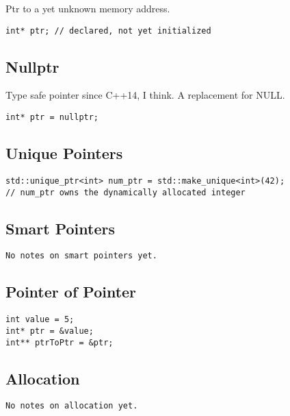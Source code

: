 Ptr to a yet unknown memory address.

\begin{verbatim}
int* ptr; // declared, not yet initialized
\end{verbatim}

\subsection{Nullptr}

Type safe pointer since C++14, I think. A replacement for NULL.

\begin{verbatim}
int* ptr = nullptr;
\end{verbatim}

\subsection{Unique Pointers}

\begin{verbatim}
std::unique_ptr<int> num_ptr = std::make_unique<int>(42);
// num_ptr owns the dynamically allocated integer
\end{verbatim}

\subsection{Smart Pointers}
\begin{verbatim}
No notes on smart pointers yet.
\end{verbatim}

\subsection{Pointer of Pointer}

\begin{verbatim}
int value = 5;
int* ptr = &value;
int** ptrToPtr = &ptr;
\end{verbatim}

\subsection{Allocation}

\begin{verbatim}
No notes on allocation yet.
\end{verbatim}

